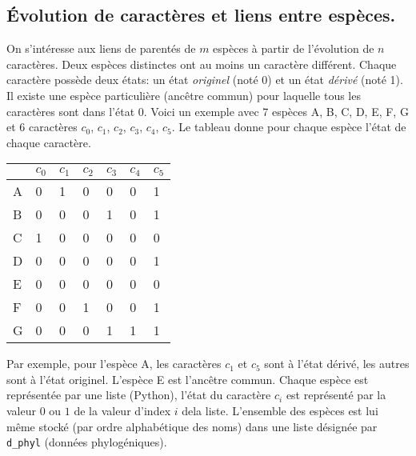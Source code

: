 \subsection{\'Evolution de caractères et liens entre espèces.}
On s'intéresse aux liens de parentés de $m$ espèces à partir de l'évolution de $n$ caractères.\newline
Deux espèces distinctes ont au moins un caractère différent.\newline
Chaque caractère possède deux états: un état \emph{originel} (noté $0$) et un état \emph{dérivé} (noté 1). Il existe une espèce particulière (ancêtre commun) pour laquelle tous les caractères sont dans l'état 0.\newline
Voici un exemple avec 7 espèces A, B, C, D, E, F, G et 6 caractères $c_0$, $c_1$, $c_2$, $c_3$, $c_4$, $c_5$. Le tableau donne pour chaque espèce l'état de chaque caractère.
\begin{center}
\begin{tabular}{lllllll}
 & $c_0$ & $c_1$ & $c_2$ & $c_3$ & $c_4$ & $c_5$\\ \hline
A & 0 & 1 & 0 & 0 & 0 & 1\\ \hline
B & 0 & 0 & 0 & 1 & 0 & 1\\ \hline
C & 1 & 0 & 0 & 0 & 0 & 0\\ \hline
D & 0 & 0 & 0 & 0 & 0 & 1\\ \hline
E & 0 & 0 & 0 & 0 & 0 & 0\\ \hline
F & 0 & 0 & 1 & 0 & 0 & 1\\ \hline
G & 0 & 0 & 0 & 1 & 1 & 1 \\ \hline
\end{tabular}
\end{center}
Par exemple, pour l'espèce A, les caractères $c_1$ et $c_5$ sont à l'état dérivé, les autres sont à l'état originel. L'espèce E est l'ancêtre commun.\newline
Chaque espèce est représentée par une liste (Python), l'état du caractère $c_i$ est représenté par la valeur $0$ ou $1$ de la valeur d'index $i$ dela liste. L'ensemble des espèces est lui même stocké (par ordre alphabétique des noms) dans une liste désignée par \verb|d_phyl| (données phylogéniques).
